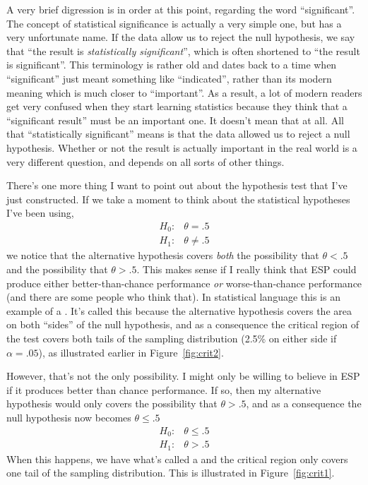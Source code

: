 \noindent
A very brief digression is in order at this point, regarding the word ``significant''. The concept of statistical significance is actually a very simple one, but has a very unfortunate name. If the data allow us to reject the null hypothesis, we say that ``the result is {\it statistically significant}'', which is often shortened to ``the result is significant''. This terminology is rather old and dates back to a time when ``significant'' just meant something like ``indicated'', rather than its modern meaning which is much closer to ``important''. As a result, a lot of modern readers get very confused when they start learning statistics because they think that a ``significant result'' must be an important one. It doesn't mean that at all. All that ``statistically significant'' means is that the data allowed us to reject a null hypothesis. Whether or not the result is actually important in the real world is a very different question, and depends on all sorts of other things. 


\noindent
There's one more thing I want to point out about the hypothesis test that I've just constructed. If we take a moment to think about the statistical hypotheses I've been using, 
$$
\begin{array}{cc}
H_0 : & \theta = .5 \\
H_1 : & \theta \neq .5 
\end{array}
$$
we notice that the alternative hypothesis covers {\it both} the possibility that $\theta < .5$ and the possibility that $\theta > .5$. This makes sense if I really think that ESP could produce either better-than-chance performance {\it or} worse-than-chance performance (and there are some people who think that). In statistical language this is an example of a . It's called this because the alternative hypothesis covers the area on both ``sides'' of the null hypothesis, and as a consequence the critical region of the test covers both tails of the sampling distribution (2.5\% on either side if $\alpha =.05$), as illustrated earlier in Figure~\ref{fig:crit2}. 

However, that's not the only possibility. I might only be willing to believe in ESP if it produces better than chance performance. If so, then my alternative hypothesis would only covers the possibility that $\theta > .5$, and as a consequence the null hypothesis now becomes $\theta \leq .5$
$$
\begin{array}{cc}
H_0 : & \theta \leq .5 \\
H_1 : & \theta > .5 
\end{array}
$$
When this happens, we have what's called a  and  the critical region only covers one tail of the sampling distribution. This is illustrated in Figure~\ref{fig:crit1}.

